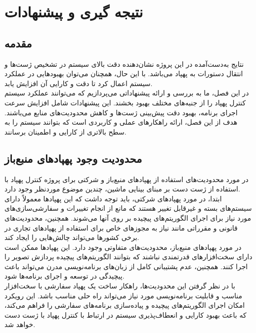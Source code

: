 \chapter{نتیجه گیری و پیشنهادات}
\section{مقدمه}
نتایج به‌دست‌آمده در این پروژه نشان‌دهنده دقت بالای سیستم در تشخیص ژست‌ها و انتقال دستورات به پهپاد می‌باشد. با این حال، همچنان می‌توان بهبودهایی در عملکرد سیستم اعمال کرد تا دقت و کارایی آن افزایش یابد.
\\
در این فصل، ما به بررسی و ارائه پیشنهاداتی می‌پردازیم که می‌توانند عملکرد سیستم کنترل پهپاد را از جنبه‌های مختلف بهبود بخشند. این پیشنهادات شامل افزایش سرعت اجرای برنامه، بهبود دقت پیش‌بینی ژست‌ها و کاهش محدودیت‌های منابع 
می‌باشند. هدف از این فصل، ارائه راهکارهای عملی و کاربردی است که بتوانند سیستم را به سطح بالاتری از کارایی و اطمینان برسانند.

\section{محدودیت وجود پهپاد‌های منبع‌باز}
در مورد محدودیت‌های استفاده از پهپادهای منبع‌باز و شرکتی برای پروژه کنترل پهپاد با استفاده از ژست دست بر مبنای بینایی ماشین، چندین موضوع موردنظر وجود دارد. 
\\
ابتدا، در مورد پهپادهای شرکتی، باید توجه داشت که این پهپادها معمولاً دارای سیستم‌های بسته و غیرقابل تغییر هستند که مانع از انجام تغییرات و سفارشی‌سازی‌های مورد نیاز برای اجرای الگوریتم‌های پیچیده بر روی آنها می‌شوند. همچنین، 
محدودیت‌های قانونی و مقرراتی مانند نیاز به مجوزهای خاص برای استفاده از پهپادهای تجاری در برخی کشورها می‌تواند چالش‌هایی را ایجاد کند.
\\
در مورد پهپادهای منبع‌باز، محدودیت‌های متفاوتی وجود دارد. این پهپادها ممکن است دارای سخت‌افزارهای قدرتمندی نباشند که بتوانند الگوریتم‌های پیچیده پردازش تصویر را اجرا کنند. همچنین، عدم پشتیبانی کامل از زبان‌های برنامه‌نویسی مدرن می‌تواند باعث پیچیدگی در توسعه و اجرای برنامه‌ها شود.
\\
با در نظر گرفتن این محدودیت‌ها، راهکار ساخت یک پهپاد سفارشی با سخت‌افزار مناسب و قابلیت برنامه‌نویسی مورد نیاز می‌تواند راه حلی مناسب باشد. این رویکرد امکان اجرای الگوریتم‌های پیچیده و پیاده‌سازی برنامه‌های سفارشی را فراهم می‌کند، که باعث بهبود کارایی و انعطاف‌پذیری سیستم در ارتباط با کنترل پهپاد با ژست دست خواهد شد.

